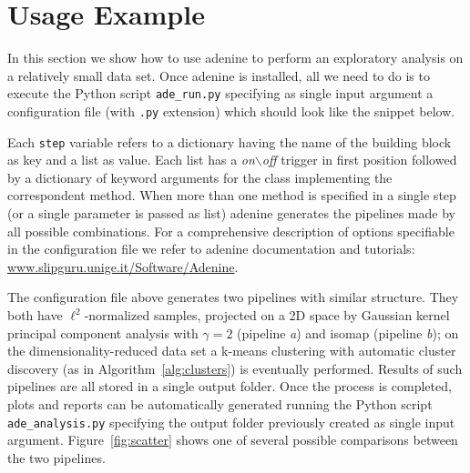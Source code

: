 \documentclass[twoside,11pt]{article}
\makeatletter
\newcommand{\ade}{{\sc adenine}\@\xspace}
\newcommand{\py}{{Python}\@\xspace}
\makeatother
\begin{document}

\section{Usage Example}
In this section we show how to use \ade to perform an exploratory analysis on a relatively small data set. Once \ade is installed, all we need to do is to execute the \py script \texttt{ade\_run.py} specifying as single input argument a configuration file (with \texttt{.py} extension) which should look like the snippet below.



\noindent Each \texttt{step} variable refers to a dictionary having the name of the building block as key and a {list} as value. Each list has a \emph{on$\backslash$off} trigger in first position followed by a dictionary of keyword arguments for the class implementing the correspondent method. When more than one method is specified in a single step (or a single parameter is passed as {list}) \ade generates the pipelines made by all possible combinations.
For a comprehensive description of options specifiable in the configuration file we refer to \ade documentation and tutorials: {\small\url{www.slipguru.unige.it/Software/Adenine}}. %

The configuration file above generates two pipelines with similar structure. They both have $\ell^2$-normalized samples, projected on a 2D space by Gaussian kernel principal component analysis with $\gamma=2$ (pipeline \textit{a}) and isomap (pipeline \textit{b}); on the dimensionality-reduced data set a k-means clustering with automatic cluster discovery (as in Algorithm~\ref{alg:clusters}) is eventually performed.
Results of such pipelines are all stored in a single output folder. Once the process is completed, plots and reports can be automatically generated running the \py script \texttt{ade\_analysis.py} specifying the output folder previously created as single input argument. Figure~\ref{fig:scatter} shows one of several possible comparisons between the two pipelines.
\end{document}
